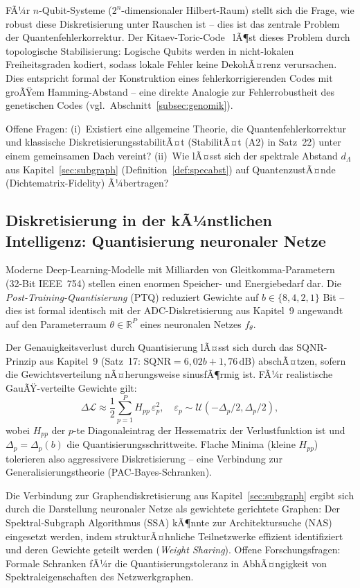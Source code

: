 ﻿\documentclass[a4paper,12pt]{article}
\theoremstyle{definition}
\begin{document}
FÃ¼r $n$-Qubit-Systeme ($2^n$-dimensionaler Hilbert-Raum) stellt sich die Frage, wie
robust diese Diskretisierung unter Rauschen ist -- dies ist das zentrale Problem der
Quantenfehlerkorrektur. Der Kitaev-Toric-Code~\cite{kitaev2003} lÃ¶st dieses Problem durch
topologische Stabilisierung: Logische Qubits werden in nicht-lokalen Freiheitsgraden
kodiert, sodass lokale Fehler keine DekohÃ¤renz verursachen. Dies entspricht formal der
Konstruktion eines fehlerkorrigierenden Codes mit groÃŸem Hamming-Abstand -- eine direkte
Analogie zur Fehlerrobustheit des genetischen Codes (vgl.\ Abschnitt~\ref{subsec:genomik}).

Offene Fragen: (i)~Existiert eine allgemeine Theorie, die Quantenfehlerkorrektur und
klassische DiskretisierungsstabilitÃ¤t (StabilitÃ¤t (A2) in Satz~22) unter einem gemeinsamen
Dach vereint? (ii)~Wie lÃ¤sst sich der spektrale Abstand $d_\Lambda$ aus
Kapitel~\ref{sec:subgraph} (Definition~\ref{def:specabst}) auf QuantenzustÃ¤nde
(Dichtematrix-Fidelity) Ã¼bertragen?

\subsection{Diskretisierung in der kÃ¼nstlichen Intelligenz: Quantisierung neuronaler Netze}

Moderne Deep-Learning-Modelle mit Milliarden von Gleitkomma-Parametern (32-Bit IEEE~754)
stellen einen enormen Speicher- und Energiebedarf dar. Die
\emph{Post-Training-Quantisierung} (PTQ) reduziert Gewichte auf $b \in \{8, 4, 2, 1\}$
Bit -- dies ist formal identisch mit der ADC-Diskretisierung aus Kapitel~9 angewandt auf
den Parameterraum $\theta \in \mathbb{R}^P$ eines neuronalen Netzes $f_\theta$.

Der Genauigkeitsverlust durch Quantisierung lÃ¤sst sich durch das SQNR-Prinzip aus
Kapitel~9 (Satz~17: $\mathrm{SQNR} = 6{,}02b + 1{,}76\,\text{dB}$) abschÃ¤tzen, sofern
die Gewichtsverteilung nÃ¤herungsweise sinusfÃ¶rmig ist. FÃ¼r realistische
GauÃŸ-verteilte Gewichte gilt:
\[
\Delta\mathcal{L} \approx \frac{1}{2}\sum_{p=1}^P H_{pp}\,\varepsilon_p^2,
\quad \varepsilon_p \sim \mathcal{U}(-\Delta_p/2, \Delta_p/2),
\]
wobei $H_{pp}$ der $p$-te Diagonaleintrag der Hessematrix der Verlustfunktion ist und
$\Delta_p = \Delta_p(b)$ die Quantisierungsschrittweite. Flache Minima (kleine $H_{pp}$)
tolerieren also aggressivere Diskretisierung -- eine Verbindung zur Generalisierungstheorie
(PAC-Bayes-Schranken).

Die Verbindung zur Graphendiskretisierung aus Kapitel~\ref{sec:subgraph} ergibt sich durch
die Darstellung neuronaler Netze als gewichtete gerichtete Graphen: Der
Spektral-Subgraph Algorithmus (SSA) kÃ¶nnte zur Architektursuche (NAS) eingesetzt werden,
indem strukturÃ¤hnliche Teilnetzwerke effizient identifiziert und deren Gewichte geteilt
werden (\emph{Weight Sharing}). Offene Forschungsfragen: Formale Schranken fÃ¼r die
Quantisierungstoleranz in AbhÃ¤ngigkeit von Spektraleigenschaften des Netzwerkgraphen.
\end{document}
